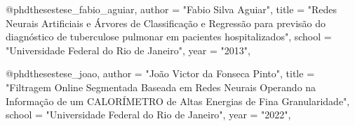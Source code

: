 


@phdtheses{tese_fabio_aguiar,
    author       = "Fabio Silva Aguiar",
    title        = "Redes Neurais Artificiais e Árvores de Classificação e Regressão para previsão do diagnóstico 
                de tuberculose pulmonar em pacientes hospitalizados",
    school       = "Universidade Federal do Rio de Janeiro",
    year         = "2013",
}

@phdtheses{tese_joao,
    author       = "João Victor da Fonseca Pinto",
    title        = "Filtragem Online Segmentada Baseada em Redes Neurais Operando na Informação de um CALORÍMETRO de Altas Energias de Fina Granularidade",
    school       = "Universidade Federal do Rio de Janeiro",
    year         = "2022",
}

